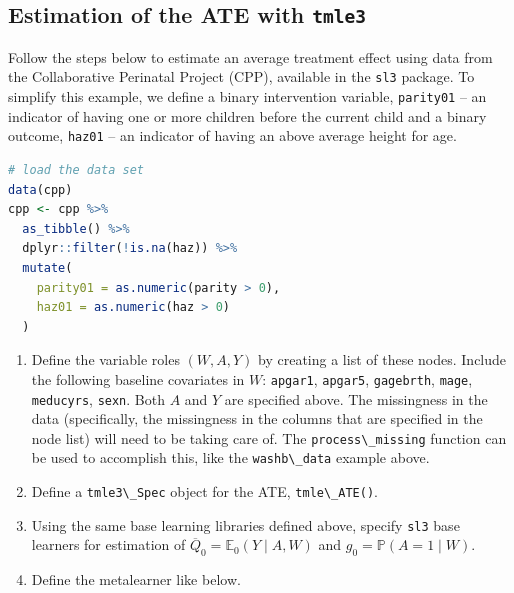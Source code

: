 \documentclass[
  12pt, krantz2,
]{krantz}
\newcommand{\passthrough}[1]{#1}
\providecommand{\tightlist}{%
  \setlength{\itemsep}{0pt}\setlength{\parskip}{0pt}}
\newcommand{\1}{\mathbbm{1}}
\theoremstyle{definition}
\theoremstyle{definition}
\theoremstyle{definition}
\theoremstyle{definition}
\theoremstyle{remark}
\begin{document}
\hypertarget{tmle3-ex1}{%
\subsection{\texorpdfstring{Estimation of the ATE with \texttt{tmle3}}{Estimation of the ATE with tmle3}}\label{tmle3-ex1}}

Follow the steps below to estimate an average treatment effect using data from
the Collaborative Perinatal Project (CPP), available in the \passthrough{\lstinline!sl3!} package. To
simplify this example, we define a binary intervention variable, \passthrough{\lstinline!parity01!} --
an indicator of having one or more children before the current child and a
binary outcome, \passthrough{\lstinline!haz01!} -- an indicator of having an above average height for
age.

\begin{lstlisting}[language=R]
# load the data set
data(cpp)
cpp <- cpp %>%
  as_tibble() %>%
  dplyr::filter(!is.na(haz)) %>%
  mutate(
    parity01 = as.numeric(parity > 0),
    haz01 = as.numeric(haz > 0)
  )
\end{lstlisting}

\begin{enumerate}
\def\labelenumi{\arabic{enumi}.}
\tightlist
\item
  Define the variable roles \((W,A,Y)\) by creating a list of these nodes.
  Include the following baseline covariates in \(W\): \passthrough{\lstinline!apgar1!}, \passthrough{\lstinline!apgar5!},
  \passthrough{\lstinline!gagebrth!}, \passthrough{\lstinline!mage!}, \passthrough{\lstinline!meducyrs!}, \passthrough{\lstinline!sexn!}. Both \(A\) and \(Y\) are specified
  above. The missingness in the data (specifically, the missingness in the
  columns that are specified in the node list) will need to be taking care of.
  The \passthrough{\lstinline!process\_missing!} function can be used to accomplish this, like the
  \passthrough{\lstinline!washb\_data!} example above.
\item
  Define a \passthrough{\lstinline!tmle3\_Spec!} object for the ATE, \passthrough{\lstinline!tmle\_ATE()!}.
\item
  Using the same base learning libraries defined above, specify \passthrough{\lstinline!sl3!} base
  learners for estimation of \(\overline{Q}_0 = \mathbb{E}_0(Y \mid A, W)\) and
  \(g_0 = \mathbb{P}(A = 1 \mid W)\).
\item
  Define the metalearner like below.
\end{enumerate}
\end{document}
